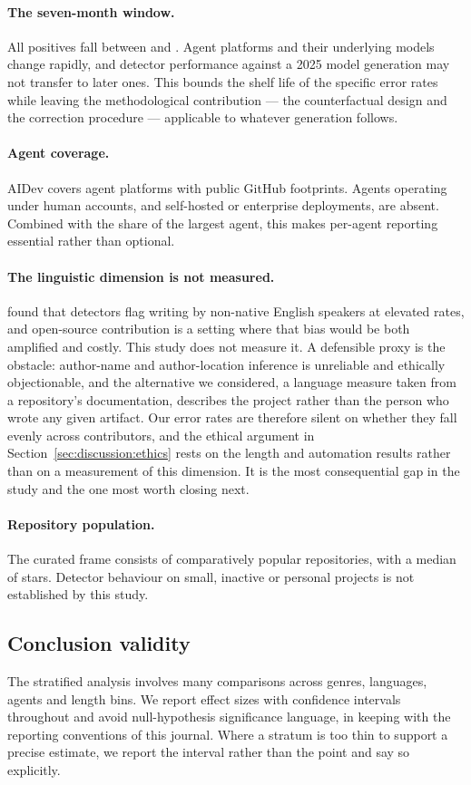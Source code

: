 \paragraph{The seven-month window.} All positives fall between \AidevWindowStart{} and
\AidevWindowEnd{}. Agent platforms and their underlying models change rapidly, and
detector performance against a 2025 model generation may not transfer to later ones.
This bounds the shelf life of the specific error rates while leaving the methodological
contribution --- the counterfactual design and the correction procedure --- applicable
to whatever generation follows.

\paragraph{Agent coverage.} AIDev covers agent platforms with public GitHub footprints.
Agents operating under human accounts, and self-hosted or enterprise deployments, are
absent. Combined with the \AidevTopAgentShare{} share of the largest agent, this makes
per-agent reporting essential rather than optional.

\paragraph{The linguistic dimension is not measured.} \citet{liang2023biased} found that
detectors flag writing by non-native English speakers at elevated rates, and open-source
contribution is a setting where that bias would be both amplified and costly. This study
does not measure it. A defensible proxy is the obstacle: author-name and author-location
inference is unreliable and ethically objectionable, and the alternative we considered,
a language measure taken from a repository's documentation, describes the project rather
than the person who wrote any given artifact. Our error rates are therefore silent on
whether they fall evenly across contributors, and the ethical argument in
Section~\ref{sec:discussion:ethics} rests on the length and automation results rather
than on a measurement of this dimension. It is the most consequential gap in the study
and the one most worth closing next.

\paragraph{Repository population.} The curated frame consists of comparatively popular
repositories, with a median of \RepoStarsMedian{} stars. Detector behaviour on small,
inactive or personal projects is not established by this study.

\subsection{Conclusion validity}
\label{sec:threats:conclusion}

The stratified analysis involves many comparisons across genres, languages, agents and
length bins. We report effect sizes with confidence intervals throughout and avoid
null-hypothesis significance language, in keeping with the reporting conventions of this
journal. Where a stratum is too thin to support a precise estimate, we report the
interval rather than the point and say so explicitly.
